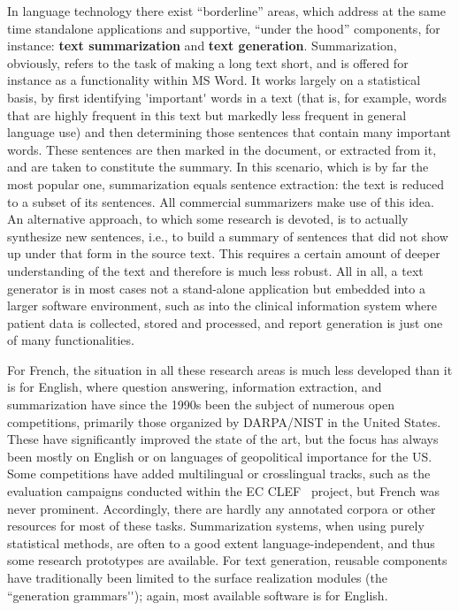 \begin{multicols}{2}
In language technology there exist ``borderline'' areas, which address at the same time standalone applications and supportive, ``under the hood''
components, for instance: {\bf text summarization} and {\bf text
  generation}. Summarization, obviously, refers to the task of making
a long text short, and is offered for instance as a functionality
within MS Word. It works largely on a statistical basis, by first
identifying {\mbox '}important{\mbox '} words in a text (that is, for example, words
that are highly frequent in this text but markedly less frequent in
general language use) and then determining those sentences that
contain many important words. These sentences are then marked in the
document, or extracted from it, and are taken to constitute the
summary. In this scenario, which is by far the most popular one,
summarization equals sentence extraction: the text is reduced to a
subset of its sentences. All commercial summarizers make use of this
idea. An alternative approach, to which some research is devoted, is
to actually synthesize new sentences, i.e., to build a summary of
sentences that did not show up under that form in the source text. This
requires a certain amount of deeper understanding of the text and
therefore is much less robust. All in all, a text generator is in most
cases not a stand-alone application but embedded into a larger
software environment, such as into the clinical information system
where patient data is collected, stored and processed, and report
generation is just one of many functionalities.

For French, the situation in all these research areas is much less
developed than it is for English, where question answering,
information extraction, and summarization have since the 1990s been
the subject of numerous open competitions, primarily those organized
by DARPA/NIST in the United States. These have significantly improved
the state of the art, but the focus has always been mostly on English
or on languages of geopolitical importance for the US. Some
competitions have added multilingual or crosslingual tracks, such as
the evaluation campaigns conducted within the EC CLEF~\cite{clef}
project, but French was never prominent. Accordingly, there are hardly
any annotated corpora or other resources for most of these
tasks. Summarization systems, when using purely statistical methods,
are often to a good extent language-independent, and thus some
research prototypes are available. For text generation, reusable
components have traditionally been limited to the surface realization
modules (the ``generation grammars{\mbox '}{\mbox '}); again, most available software is
for English.


\end{multicols}
